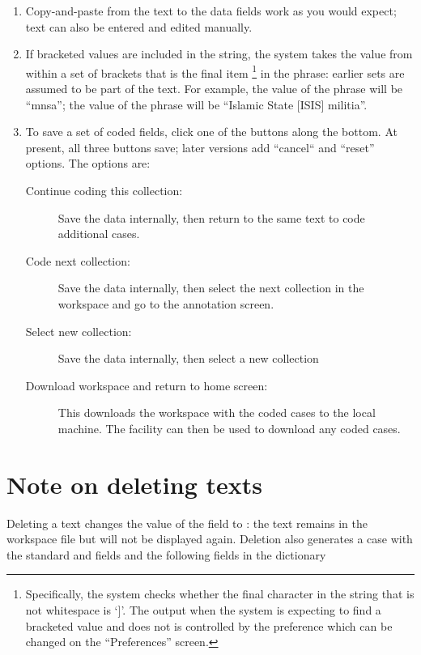 \documentclass[letterpaper,10pt,english]{sphinxmanual}
\begin{document}
\begin{enumerate}
\item {} 
Copy-and-paste from the text to the data fields work as you would
expect; text can also be entered and edited manually.

\item {} 
If bracketed values are included in the string, the system takes
the value from within a set of brackets that is the final item \footnote{
Specifically, the system checks whether the final character in the
string that is not whitespace is ‘{]}’. The output when the system is
expecting to find a bracketed value and does not is controlled by
the preference  which can be
changed on the “Preferences” screen.
}
in the phrase: earlier sets are
assumed to be part of the text. For example, the value of the
phrase  will be “mnsa”; the value
of the phrase  will be
“Islamic State {[}ISIS{]} militia”.

\item {} 
To save a set of coded fields, click one of the buttons along the
bottom. At present, all three buttons save; later versions add
``cancel“ and ``reset” options. The options are:
\begin{description}
\item[{Continue coding this collection:}] \leavevmode
Save the data internally, then return to the same text to code
additional cases.

\item[{Code next collection:}] \leavevmode
Save the data internally, then select the next collection in the
workspace and go to the annotation screen.

\item[{Select new collection:}] \leavevmode
Save the data internally, then select a new collection

\item[{Download workspace and return to home screen:}] \leavevmode
This downloads the workspace with the coded cases to the local
machine. The {\hyperref[workspaces:sec-management]{\emph{}}} facility  can then be used to download any coded cases.

\end{description}

\end{enumerate}


\section{Note on deleting texts}
\label{extraction:note-on-deleting-texts}
Deleting a text changes the value of the  field to
: the text remains in the workspace file but will not be
displayed again. Deletion also generates a case with the standard
 and  fields and the following fields in the
 dictionary
\end{document}
